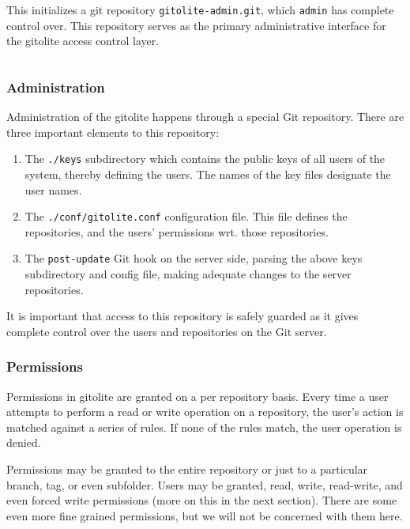 This initializes a git repository \texttt{gitolite-admin.git}, which
\texttt{admin} has complete control over. This repository serves as the primary
administrative interface for the gitolite access control layer.

\begin{lstlisting}

\end{lstlisting}

\subsubsection{Administration}

Administration of the gitolite happens through a special Git repository. There
are three important elements to this repository:

\begin{enumerate}

\item The \texttt{./keys} subdirectory which contains the public keys of all
users of the system, thereby defining the users. The names of the key files
designate the user names\cite{gitolite-com-2014d}.

\item The \texttt{./conf/gitolite.conf} configuration file. This file defines
the repositories, and the users' permissions wrt. those repositories.

\item The \texttt{post-update} Git hook on the server side, parsing the above
keys subdirectory and config file, making adequate changes to the server
repositories.

\end{enumerate}

It is important that access to this repository is safely guarded as it gives
complete control over the users and repositories on the Git server.

\subsubsection{Permissions}

Permissions in gitolite are granted on a per repository basis. Every time a
user attempts to perform a read or write operation on a repository, the user's
action is matched against a series of rules. If none of the rules match, the
user operation is denied.

Permissions may be granted to the entire repository or just to a particular
branch, tag, or even subfolder. Users may be granted, read, write, read-write,
and even forced write permissions (more on this in the next section).  There
are some even more fine grained permissions\cite{gitolite-com-2014e}, but we
will not be concerned with them here.

